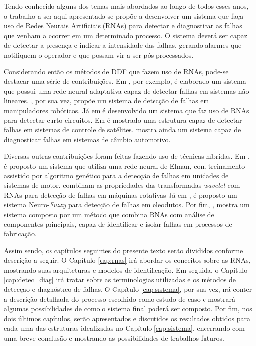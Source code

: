 Tendo conhecido alguns dos temas mais abordados ao longo de todos esses anos, o
trabalho a ser aqui apresentado se propõe a desenvolver um sistema que faça uso
de Redes Neurais Artificiais (RNAs) para detectar e diagnosticar as falhas que
venham a ocorrer em um determinado processo. O sistema deverá ser capaz de
detectar a presença e indicar a intensidade das falhas, gerando alarmes que
notifiquem o operador e que possam vir a ser pós-processados.


Considerando então os métodos de DDF que fazem uso de RNAs, pode-se destacar uma
série de contribuições. Em , por exemplo, é elaborado
um sistema que possui uma rede neural adaptativa capaz de detectar falhas em
sistemas não-lineares. , por sua vez, propõe um sistema
de detecção de falhas em manipuladores robóticos. Já em 
é desenvolvido um sistema que faz uso de RNAs para detectar curto-circuitos. Em
 é mostrado uma estrutura capaz de detectar falhas em
sistemas de controle de satélites.  mostra ainda um
sistema capaz de diagnosticar falhas em sistemas de câmbio automotivo.

Diversas outras contribuições foram feitas fazendo uso de técnicas híbridas. Em
, é proposto um sistema que utiliza uma rede neural de
Elman, com treinamento assistido por algoritmo genético para a detecção de
falhas em unidades de sistemas de motor.  combinam as
propriedades das transformadas {\it wavelet} com RNAs para detecção de falhas em
máquinas rotativas Já em , é proposto um sistema
Neuro-{\it Fuzzy} para detecção de falhas em oleodutos. Por fim,
, mostra um sistema composto por um método que combina
RNAs com análise de componentes principais, capaz de identificar e isolar falhas
em processos de fabricação.

Assim sendo, os capítulos seguintes do presente texto serão divididos conforme
descrição a seguir. O Capítulo \ref{cap:rnas} irá abordar os conceitos sobre as
RNAs, mostrando suas arquiteturas e modelos de identificação. Em seguida, o
Capítulo \ref{cap:detec_diag} irá tratar sobre as terminologias utilizadas e os
métodos de detecção e diagnóstico de falhas. O Capítulo \ref{cap:sistema}, por
sua vez, irá conter a descrição detalhada do processo escolhido como estudo de
caso e mostrará algumas possibilidades de como o sistema final poderá ser
composto. Por fim, nos dois últimos capítulos, serão apresentados e discutidos
os resultados obtidos para cada uma das estruturas idealizadas no Capítulo
\ref{cap:sistema}, encerrando com uma breve conclusão e mostrando as
possibilidades de trabalhos futuros.
